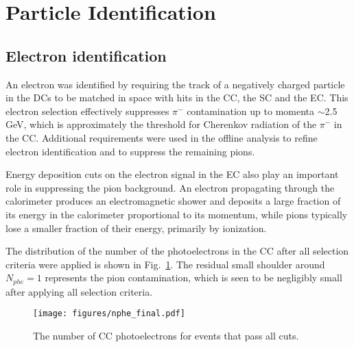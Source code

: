 \documentclass[prc,aps,floatfix,showpacs,showkeys,twocolumn,superscriptaddress,letterpaper,10pt]{revtex4-1}
\begin{document}
\section{ Particle Identification}

\subsection{Electron identification} 
An electron was identified by requiring the track of a negatively charged particle in the DCs to 
be matched  in space with hits in 
the  CC,  the SC and the  EC.
This electron selection effectively suppresses $\pi^{-}$ contamination up to momenta $\sim$2.5 GeV, which is approximately the threshold for Cherenkov radiation of the $\pi^{-}$ in the CC. 
Additional requirements were used in the offline analysis to refine electron identification and to suppress the  remaining pions.

Energy deposition cuts on the electron signal in the EC  also play an important role in suppressing the pion background.
 An electron propagating through the  calorimeter produces an electromagnetic shower and deposits a large fraction of its energy in the calorimeter proportional to its momentum, while  pions typically lose a smaller fraction of their energy,  primarily   by ionization. 
 


 
The distribution of the number of the photoelectrons in the CC after all selection criteria were applied is shown in 
Fig.~\ref{fig:cc_match}. 
The residual small shoulder around
$N_{phe}=1$ represents the  pion contamination, which is seen to be negligibly small after applying  all selection criteria. 

\begin{figure}[h]
\centering 
\texttt{[image: figures/nphe\_final.pdf]}
\caption{
The number of CC photoelectrons for events that pass all cuts.}
\label{fig:cc_match}
\end{figure}
\end{document}
